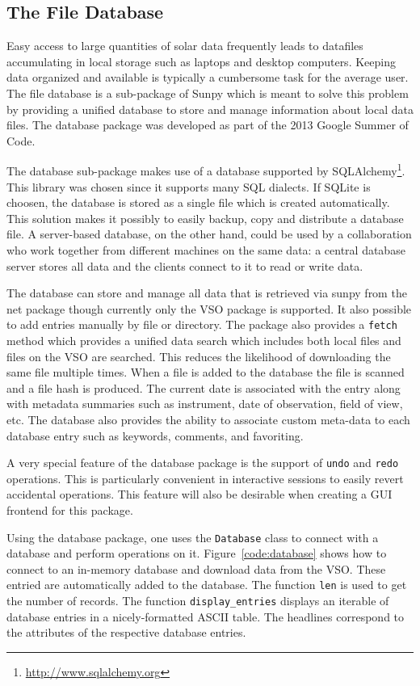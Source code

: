\subsection{The File Database}
Easy access to large quantities of solar data frequently leads to datafiles accumulating
in local storage such as laptops and desktop computers. Keeping data organized and available
is typically a cumbersome task for the average user. The file database is a sub-package of 
Sunpy which is meant to solve this problem by providing a unified database to store and manage information about 
local data files. The database package was developed as part of the 2013 
Google Summer of Code. 

The database sub-package makes use of a database supported by
SQLAlchemy\footnote{\url{http://www.sqlalchemy.org}}. This library was chosen
since it supports many SQL dialects. If SQLite is choosen, the database is stored as a single file which is
created automatically. This solution makes it possibly to easily backup, copy and distribute
a database file. A server-based database, on the other hand, could be used by a collaboration 
who work together from different machines on the
same data: a central database server stores all data and the clients connect to
it to read or write data.

The database can store and manage all data that is retrieved via sunpy from the net
package though currently only the \textsc{VSO} package is supported. 
It also possible to add entries manually by file or directory. The package also provides
a \texttt{fetch} method which provides a unified data search which includes both local files
and files on the \textsc{VSO} are searched. This reduces the likelihood of downloading the same file 
multiple times. When a file is added to the database the file is scanned and a file hash is produced. 
The current date is associated with the entry along with metadata summaries such 
as instrument, date of observation, field of view, etc. 
The database also provides the ability to associate custom meta-data to 
each database entry such as keywords, comments, and favoriting.

A very special feature of the database package is the support of \texttt{undo}
and \texttt{redo} operations. This is particularly convenient in
interactive sessions to easily revert accidental operations. 
This feature will also be desirable when creating a GUI frontend for this package.

Using the database package, one uses the \texttt{Database} class to connect
with a database and perform operations on it. Figure~\ref{code:database} shows how to connect
to an in-memory database and download data from the \textsc{VSO}. These entried are
automatically added to the database. The function \texttt{len} is used to get the number of
records. The function \texttt{display\_entries} displays an iterable of database entries
in a nicely-formatted \textsc{ASCII} table. The headlines correspond to the
attributes of the respective database entries.

